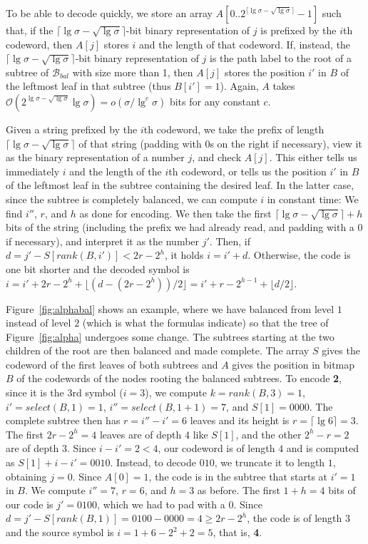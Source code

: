 \documentclass[preprint,12pt]{elsarticle}
\newcommand{\Oh}[1]{\ensuremath{\mathcal{O}\!\left({#1}\right)}}
\newcommand{\B}{\mathcal{B}}
\renewcommand{\log}{\lg}
\begin{document}
To be able to decode quickly, we store an array \(A [0..2^{\lceil \lg \sigma  - \sqrt{\lg \sigma} \rceil}-1]\) such that, if the \(\lceil \lg \sigma  - \sqrt{\lg \sigma} \rceil\)-bit binary representation of \(j\) is prefixed by the $i$th codeword, then \(A [j]\) stores $i$ and the length of that codeword. If, instead, the \(\lceil \lg \sigma  - \sqrt{\lg \sigma} \rceil\)-bit binary representation of $j$ is the path label to the root of a subtree of $\B_{bal}$ with size more than 1, then \(A [j]\) stores the position $i'$ in $B$ of the leftmost leaf in that subtree (thus $B[i']=1$).  Again, $A$ takes \(\Oh{2^{\log \sigma - \sqrt{\log \sigma}} \log \sigma} = o(\sigma / \log^c \sigma)\) bits for any constant $c$.

Given a string prefixed by the $i$th codeword, we take the prefix of length \(\lceil \lg \sigma  - \sqrt{\lg \sigma} \rceil\) of that string (padding with 0s on the right if necessary), view it as the binary representation of a number $j$, and check \(A [j]\).  This either tells us immediately $i$ and the length of the $i$th codeword, or tells us the position $i'$ in $B$ of the leftmost leaf in the subtree containing the desired leaf. In the latter case, since the subtree is completely balanced, we can compute $i$ in constant time: We find $i''$, $r$,
and $h$ as done for encoding. We then take the first $\lceil \lg\sigma - 
\sqrt{\lg\sigma}\rceil+h$ bits of the string
(including the prefix we had already read, and padding with a 0 if necessary), and interpret it as the number $j'$. Then, if
$d = j'-S[rank(B,i')] < 2r-2^h$, it holds $i = i'+d$. Otherwise, the code is 
one bit shorter and the decoded symbol is $i= i'+2r-2^h + \lfloor (d-(2r-2^h))/2
\rfloor = i'+r-2^{h-1}+\lfloor d/2 \rfloor$.

Figure~\ref{fig:alphabal} shows an example, where we have balanced from level
$1$ instead of level $2$ (which is what the formulas indicate) so that the
tree of Figure~\ref{fig:alpha} undergoes some change. The subtrees starting
at the two children of the root are then balanced and made complete. The array
$S$ gives the codeword of the first leaves of both subtrees and $A$ gives the
position in bitmap $B$ of the codewords of the nodes rooting the balanced
subtrees. To encode {\bf 2}, since it is the 3rd symbol ($i=3$), we compute
$k=rank(B,3)=1$, $i'=select(B,1)=1$, $i'' = select(B,1+1)=7$, and 
$S[1] = 0000$. The complete subtree then has $r=i''-i' = 6$ leaves and its 
height is $r=\lceil \lg 6 \rceil = 3$. The first $2r-2^h = 4$ leaves are of
depth $4$ like $S[1]$, and the other $2^h-r=2$ are of depth $3$. Since
$i-i' = 2 < 4$, our codeword is of length $4$ and is computed as
$S[1]+i-i' = 0010$. Instead, to decode $010$, we truncate it to length $1$,
obtaining $j=0$. Since $A[0]=1$, the code is in the subtree that starts at
$i'=1$ in $B$. We compute $i''=7$, $r=6$, and $h=3$ as before. The first $1+h=4$
bits of our code is $j'=0100$, which we had to pad with a $0$. Since 
$d=j'-S[rank(B,1)]=0100-0000 = 4 \ge 2r-2^h$, the code is of length $3$ and
the source symbol is $i=1+6-2^2+2=5$, that is, {\bf 4}.
\end{document}
